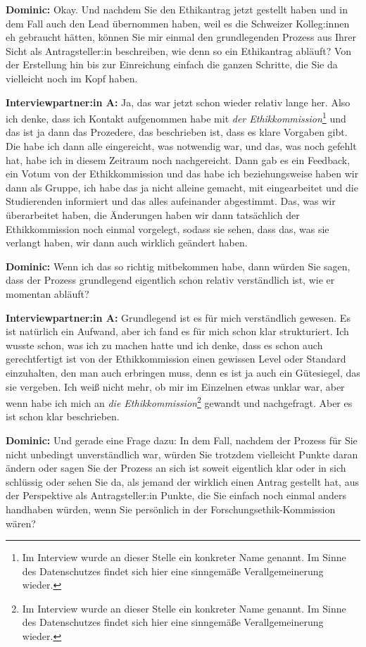\documentclass[a4paper,12pt,twoside]{scrreprt}
\begin{document}
\textbf{Dominic:} Okay. Und nachdem Sie den Ethikantrag jetzt gestellt haben und in dem Fall auch den Lead übernommen haben, weil es die Schweizer Kolleg:innen eh gebraucht hätten, können Sie mir einmal den grundlegenden Prozess aus Ihrer Sicht als Antragsteller:in beschreiben, wie denn so ein Ethikantrag abläuft? Von der Erstellung hin bis zur Einreichung einfach die ganzen Schritte, die Sie da vielleicht noch im Kopf haben.

\textbf{Interviewpartner:in A:} Ja, das war jetzt schon wieder relativ lange her. Also ich denke, dass ich Kontakt aufgenommen habe mit \textit{der Ethikkommission}\footnote{Im Interview wurde an dieser Stelle ein konkreter Name genannt. Im Sinne des Datenschutzes findet sich hier eine sinngemäße Verallgemeinerung wieder.} und das ist ja dann das Prozedere, das beschrieben ist, dass es klare Vorgaben gibt. Die habe ich dann alle eingereicht, was notwendig war, und das, was noch gefehlt hat, habe ich in diesem Zeitraum noch nachgereicht. Dann gab es ein Feedback, ein Votum von der Ethikkommission und das habe ich beziehungsweise haben wir dann als Gruppe, ich habe das ja nicht alleine gemacht, mit eingearbeitet und die Studierenden informiert und das alles aufeinander abgestimmt. Das, was wir überarbeitet haben, die Änderungen haben wir dann tatsächlich der Ethikkommission noch einmal vorgelegt, sodass sie sehen, dass das, was sie verlangt haben, wir dann auch wirklich geändert haben.

\textbf{Dominic:} Wenn ich das so richtig mitbekommen habe, dann würden Sie sagen, dass der Prozess grundlegend eigentlich schon relativ verständlich ist, wie er momentan abläuft?

\textbf{Interviewpartner:in A:} Grundlegend ist es für mich verständlich gewesen. Es ist natürlich ein Aufwand, aber ich fand es für mich schon klar strukturiert. Ich wusste schon, was ich zu machen hatte und ich denke, dass es schon auch gerechtfertigt ist von der Ethikkommission einen gewissen Level oder Standard einzuhalten, den man auch erbringen muss, denn es ist ja auch ein Gütesiegel, das sie vergeben. Ich weiß nicht mehr, ob mir im Einzelnen etwas unklar war, aber wenn habe ich mich an \textit{die Ethikkommission}\footnote{Im Interview wurde an dieser Stelle ein konkreter Name genannt. Im Sinne des Datenschutzes findet sich hier eine sinngemäße Verallgemeinerung wieder.} gewandt und nachgefragt. Aber es ist schon klar beschrieben.

\textbf{Dominic:} Und gerade eine Frage dazu: In dem Fall, nachdem der Prozess für Sie nicht unbedingt unverständlich war, würden Sie trotzdem vielleicht Punkte daran ändern oder sagen Sie der Prozess an sich ist soweit eigentlich klar oder in sich schlüssig oder sehen Sie da, als jemand der wirklich einen Antrag gestellt hat, aus der Perspektive als Antragsteller:in Punkte, die Sie einfach noch einmal anders handhaben würden, wenn Sie persönlich in der Forschungsethik-Kommission wären?
\end{document}
